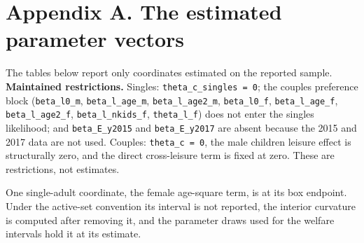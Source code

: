 \documentclass[11pt,a4paper]{article}
\begin{document}
\appendix

\section{Appendix A. The estimated parameter vectors}\label{appendix-a.-the-estimated-parameter-vectors}

The tables below report only coordinates estimated on the reported sample. \textbf{Maintained restrictions.} Singles: \texttt{theta\_c\_singles\ =\ 0}; the couples preference block (\texttt{beta\_l0\_m}, \texttt{beta\_l\_age\_m}, \texttt{beta\_l\_age2\_m}, \texttt{beta\_l0\_f}, \texttt{beta\_l\_age\_f}, \texttt{beta\_l\_age2\_f}, \texttt{beta\_l\_nkids\_f}, \texttt{theta\_l\_f}) does not enter the singles likelihood; and \texttt{beta\_E\_y2015} and \texttt{beta\_E\_y2017} are absent because the 2015 and 2017 data are not used. Couples: \texttt{theta\_c\ =\ 0}, the male children leisure effect is structurally zero, and the direct cross-leisure term is fixed at zero. These are restrictions, not estimates.

One single-adult coordinate, the female age-square term, is at its box endpoint. Under the active-set convention its interval is not reported, the interior curvature is computed after removing it, and the parameter draws used for the welfare intervals hold it at its estimate.
\end{document}
